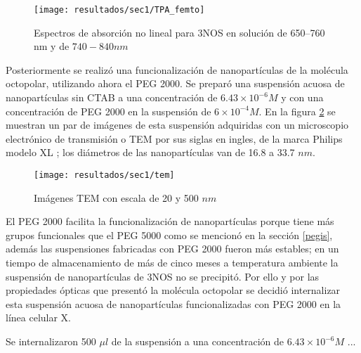 \begin{figure}[h]
\centering
\texttt{[image: resultados/sec1/TPA\_femto]}
\caption{Espectros de absorci\'on no lineal para 3NOS en soluci\'on de 650--760 nm y de $740-840nm$}\label{valoressigmafs}
\end{figure}

Posteriormente se realiz\'o una funcionalizaci\'on de nanopart\'iculas de la mol\'ecula octopolar, utilizando ahora el PEG 2000. Se prepar\'o una suspensi\'on acuosa de nanopart\'iculas sin CTAB a una concentraci\'on de $6.43 \times 10^{-6} M$ y con una concentraci\'on de PEG 2000 en la suspensi\'on de $6\times 10^{-4} M$. En la figura \ref{temi} se muestran un par de im\'agenes de esta suspensi\'on adquiridas con un microscopio electr\'onico de transmisi\'on o TEM por sus siglas en ingles, de la marca Philips modelo XL ; los di\'ametros de las nanopart\'iculas van de 16.8 a 33.7 $nm$. 

\begin{figure}[h]
\centering
\texttt{[image: resultados/sec1/tem]}
\caption{Im\'agenes TEM con escala de 20 y 500 $nm$}\label{temi}
\end{figure}

El PEG 2000 facilita la funcionalizaci\'on de nanopart\'iculas porque tiene m\'as grupos funcionales que el PEG 5000 como se mencion\'o en la secci\'on \ref{pegis}, adem\'as las suspensiones fabricadas con PEG 2000 fueron m\'as estables; en un tiempo de almacenamiento de m\'as de cinco meses a temperatura ambiente la suspensi\'on de nanopart\'iculas de 3NOS no se precipit\'o. Por ello y por las propiedades \'opticas que present\'o la mol\'ecula octopolar se decidi\'o internalizar esta suspensi\'on acuosa de nanopart\'iculas funcionalizadas con PEG 2000 en la l\'inea celular X.

Se internalizaron 500 $\mu l$ de la suspensi\'on a una concentraci\'on de $6.43 \times 10^{-6} M$ ...  



